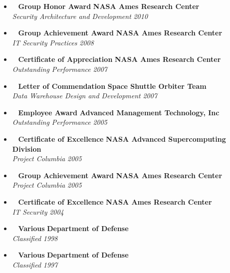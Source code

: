 \begin{itemize}
	\parskip=0.1em

	\item\ 
	\headerrow
		{\textbf{Group Honor Award}}
		{\textbf{NASA Ames Research Center}}
	\\
	\headerrow
		{\emph{Security Architecture and Development}}
		{\emph{2010}}

	\item\ 
	\headerrow
		{\textbf{Group Achievement Award}}
		{\textbf{NASA Ames Research Center}}
	\\
	\headerrow
		{\emph{IT Security Practices}}
		{\emph{2008}}

	\item\ 
	\headerrow
		{\textbf{Certificate of Appreciation}}
		{\textbf{NASA Ames Research Center}}
	\\
	\headerrow
		{\emph{Outstanding Performance}}
		{\emph{2007}}
	
	\item\ 
	\headerrow
		{\textbf{Letter of Commendation}}
		{\textbf{Space Shuttle Orbiter Team}}
	\\
	\headerrow
		{\emph{Data Warehouse Design and Development}}
		{\emph{2007}}
		
	\item\ 
	\headerrow
		{\textbf{Employee Award}}
		{\textbf{Advanced Management Technology, Inc}}
	\\
	\headerrow
		{\emph{Outstanding Performance}}
		{\emph{2005}}

	\item\ 
	\headerrow
		{\textbf{Certificate of Excellence}}
		{\textbf{NASA Advanced Supercomputing Division}}
	\\
	\headerrow
		{\emph{Project Columbia}}
		{\emph{2005}}

	\item\ 
	\headerrow
		{\textbf{Group Achievement Award}}
		{\textbf{NASA Ames Research Center}}
	\\
	\headerrow
		{\emph{Project Columbia}}
		{\emph{2005}}

	\item\ 
	\headerrow
		{\textbf{Certificate of Excellence}}
		{\textbf{NASA Ames Research Center}}
	\\
	\headerrow
		{\emph{IT Security}}
		{\emph{2004}}

	\item\ 
	\headerrow
		{\textbf{Various}}
		{\textbf{Department of Defense}}
	\\
	\headerrow
		{\emph{Classified}}
		{\emph{1998}}
		\item\ 
	\headerrow
		{\textbf{Various}}
		{\textbf{Department of Defense}}
	\\
	\headerrow
		{\emph{Classified}}
		{\emph{1997}}
		
\end{itemize}

